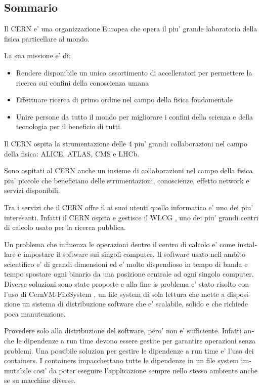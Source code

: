 \begin{otherlanguage}{italian}
\chapter*{Sommario}

Il CERN e' una organizzazione Europea che opera il piu' grande laboratorio
        della fisica particellare al mondo.

La sua missione e' di:

\begin{itemize}
        \item Rendere disponibile un unico assortimento di accelleratori per permettere la ricerca sui confini della conoscienza umana
        \item Effettuare ricerca di primo ordine nel campo della fisica fondamentale
        \item Unire persone da tutto il  mondo per migliorare i confini della scienza e della tecnologia per il beneficio di tutti.
\end{itemize}

Il CERN ospita la strumentazione delle 4 piu' grandi collaborazioni nel campo
        della fisica: ALICE, ATLAS, CMS e LHCb.

Sono ospitati al CERN anche un insieme di collaborazioni nel campo della fisica
        piu' piccole che beneficiano delle strumentazioni, conoscienze, effetto
        network e servizi disponibili.

Tra i servizi che il CERN offre il ai suoi utenti quello informatico e' uno dei
        piu' interesanti. Infatti il CERN ospita e gestisce il WLCG
        \cite{grid:website}, uno dei piu' grandi centri di calcolo usato per la
        ricerca pubblica.

Un problema che influenza le operazioni dentro il centro di calcolo e'
        come installare e impostare il software sui singoli computer. Il
        software usato nell ambito scientifico e' di grandi dimensioni ed e' molto
        dispendioso in tempo di banda e tempo spostare ogni binario da una
        posizione centrale ad ogni singolo computer. Diverse soluzioni sono
        state proposte e alla fine is problema e' stato risolto con l'uso di
        CernVM-FileSystem \cite{cvmfs}, un file system di sola lettura che mette a
        disposizione un sistema di distribuzione software che e' scalabile,
        solido e che richiede poca manutenzione.

Provedere solo alla distribuzione del software, pero' non e' sufficiente.
        Infatti anche le dipendenze a run time devono essere gestite per
        garantire operazioni senza problemi. Una possibile soluzion per gestire le
        dipendenze a run time e' l'uso dei containers. I containers
        impacchettano tutte le dipendenze in un file system immutabile cosi' da
        poter eseguire l'applicazione sempre nello stesso ambiente anche se su
        macchine diverse.


\end{otherlanguage}
